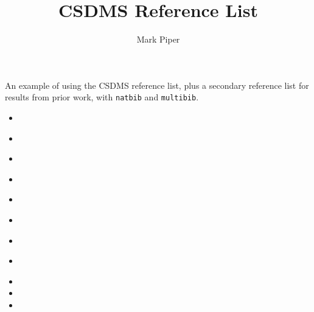 \documentclass[11pt]{article}
\begin{document}
\title{CSDMS Reference List}
\author{Mark Piper}
\maketitle

An example of using the CSDMS reference list,
plus a secondary reference list for results from prior work,
with \texttt{natbib} and \texttt{multibib}.

\begin{itemize}
\item \citep{tucker2010modeling}
\item \citet{overeem2015strategies}
\item \citep{kettner2008hydrotrend}
\item \citet{hutton2008sedflux}
\item \cite{piper2015wmt}
\item \cite{blanca2017compute}
\item \cite{jupyter2015notebook}
\item \cite{gdal2017gdal}
\item {}
\item {}
\item {}
\end{itemize}




\end{document}
